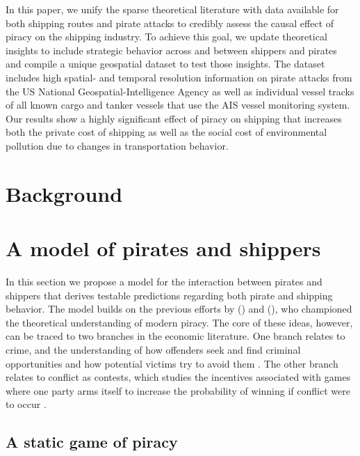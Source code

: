 \documentclass[11pt, oneside]{article}   	%
\begin{document}
In this paper, we unify the sparse theoretical literature with data available for both shipping routes and pirate attacks to credibly assess the causal effect of piracy on the shipping industry. To achieve this goal, we update theoretical insights to include strategic behavior across and between shippers and pirates and compile a unique geospatial dataset to test those insights. The dataset includes high spatial- and temporal resolution information on pirate attacks from the US National Geospatial-Intelligence Agency as well as individual vessel tracks of all known cargo and tanker vessels that use the AIS vessel monitoring system. Our results show a highly significant effect of piracy on shipping that increases both the private cost of shipping as well as the social cost of environmental pollution due to changes in transportation behavior. 

\section{Background}

\section{A model of pirates and shippers}
In this section we propose a model for the interaction between pirates and shippers that derives testable predictions regarding both pirate and shipping behavior. The model builds on the previous efforts by \citeauthor{guha2011pirates} (\citeyear{guha2011pirates}) and  \citeauthor{hallwood2013economic} (\citeyear{hallwood2013economic}), who championed the theoretical understanding of modern piracy. The core of these ideas, however, can be traced to two branches in the economic literature. One branch relates to crime, and the understanding of how offenders seek and find criminal opportunities and how potential victims try to avoid them \parencite{ becker1968crime,cook1986demand,shavell1990individual,hylton1996optimal,garoupa1997theory}. The other branch relates to conflict as contests, which studies the incentives associated with games where one party arms itself to increase the probability of winning if conflict were to occur \parencite{baik1994effort,grossman1995swords,garfinkel2007economics}.

\subsection{A static game of piracy}
\end{document}
